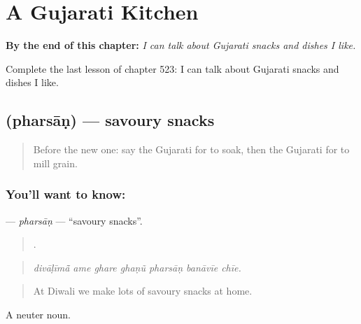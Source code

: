 
\chapter{A Gujarati Kitchen}
\label{ch:gu-a-gujarati-kitchen}

\begin{chapteropening}
\textbf{By the end of this chapter:} \emph{I can talk about Gujarati snacks and dishes I like.}

Complete the last lesson of chapter 523: I can talk about Gujarati snacks and dishes I like.
\end{chapteropening}

\section[\texorpdfstring{\gu{ફરસાણ} (pharsāṇ)}{ફરસાણ (pharsāṇ)}]{ (pharsāṇ) — savoury snacks}

\label{lesson:GU-C523-pharsan}



\begin{quote}
Before the new one: say the Gujarati for to soak, then the Gujarati for to mill grain.
\end{quote}

\subsection*{You'll want to know: }
\textbf{} — \emph{pharsāṇ} — \textquotedblleft{}savoury snacks\textquotedblright{}.

\begin{quote}
      .
\end{quote}

\begin{quote}
\emph{divāḷīmā̃ ame ghare ghaṇũ pharsāṇ banāvīe chīe.}
\end{quote}

\begin{quote}
At Diwali we make lots of savoury snacks at home.
\end{quote}

A neuter noun.

